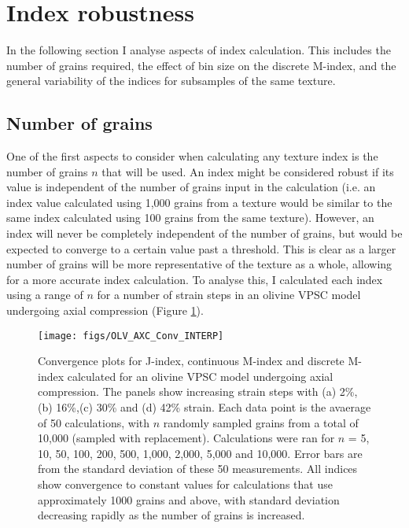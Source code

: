 \documentclass[a4paper,12pt,twoside]{report}
\numberwithin{equation}{chapter}
\begin{document}
\section{Index robustness}
In the following section I analyse aspects of index calculation. This includes the number of grains required, the effect of bin size on the discrete M-index, and the general variability of the indices for subsamples of the same texture. 

\subsection{Number of grains} \label{sec:no_grains_analysis}

One of the first aspects to consider when calculating any texture index is the number of grains $n$ that will be used. An index might be considered robust if its value is independent of the number of grains input in the calculation (i.e. an index value calculated using 1,000 grains from a texture would be similar to the same index calculated using 100 grains from the same texture). However, an index will never be completely independent of the number of grains, but would be expected to converge to a certain value past a threshold. This is clear as a larger number of grains will be more representative of the texture as a whole, allowing for a more accurate index calculation. To analyse this, I calculated each index using a range of $n$ for a number of strain steps in an olivine VPSC model undergoing axial compression (Figure \ref{fig:OLV_AXC_n_conv}). 

\begin{figure}[bht]
  \centering
    \texttt{[image: figs/OLV\_AXC\_Conv\_INTERP]}
  \caption[Convergence with no. grains (olivine VPSC)]{Convergence plots for J-index, continuous M-index and discrete M-index calculated for an olivine VPSC model undergoing axial compression. The panels show increasing strain steps with (a) 2\%, (b) 16\%,(c) 30\% and (d) 42\% strain. Each data point is the avaerage of 50 calculations, with $n$ randomly sampled grains from a total of 10,000 (sampled with replacement). Calculations were ran for $n$ = 5, 10, 50, 100, 200, 500, 1,000, 2,000, 5,000 and 10,000. Error bars are from the standard deviation of these 50 measurements. All indices show convergence to constant values for calculations that use approximately 1000 grains and above, with standard deviation decreasing rapidly as the number of grains is increased.}
  \label{fig:OLV_AXC_n_conv}
\end{figure}
\end{document}
